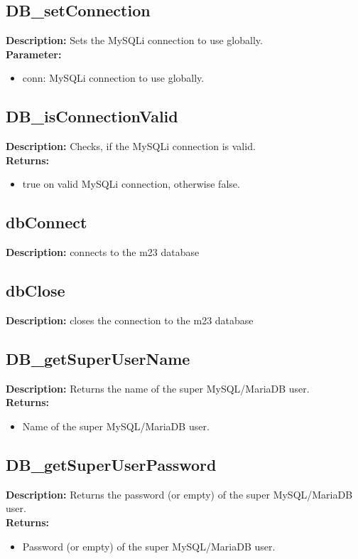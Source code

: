 \subsection{DB\_setConnection}
\textbf{Description:} Sets the MySQLi connection to use globally.\\
\textbf{Parameter:}
\begin{itemize}
\item conn: MySQLi connection to use globally.
\end{itemize}

\subsection{DB\_isConnectionValid}
\textbf{Description:} Checks, if the MySQLi connection is valid.\\
\textbf{Returns:}
\begin{itemize}
\item true on valid MySQLi connection, otherwise false.
\end{itemize}

\subsection{dbConnect}
\textbf{Description:} connects to the m23 database\\

\subsection{dbClose}
\textbf{Description:} closes the connection to the m23 database\\

\subsection{DB\_getSuperUserName}
\textbf{Description:} Returns the name of the super MySQL/MariaDB user.\\
\textbf{Returns:}
\begin{itemize}
\item Name of the super MySQL/MariaDB user.
\end{itemize}

\subsection{DB\_getSuperUserPassword}
\textbf{Description:} Returns the password (or empty) of the super MySQL/MariaDB user.\\
\textbf{Returns:}
\begin{itemize}
\item Password (or empty) of the super MySQL/MariaDB user.
\end{itemize}


